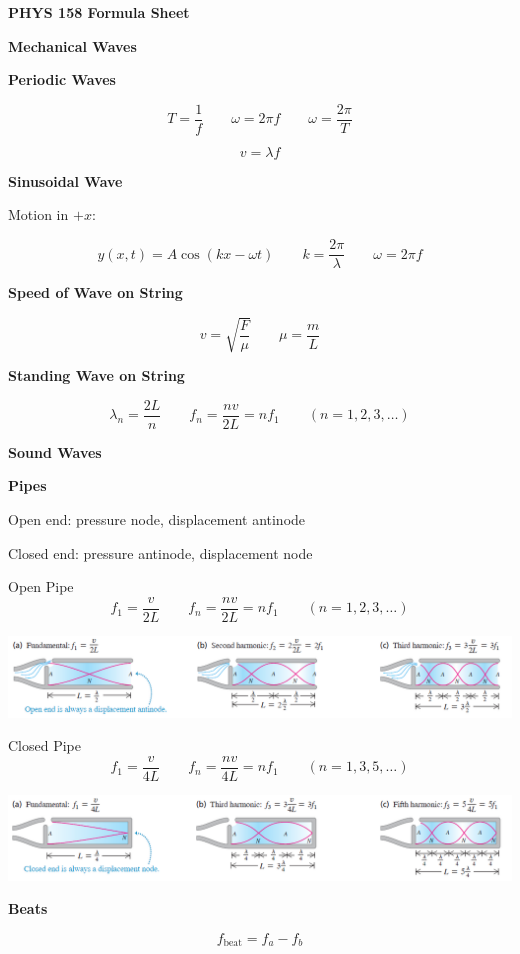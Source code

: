 \documentclass[10pt]{article}
\newcommand\sectionheading[1]{\begin{center}\large{\textbf{#1}}\end{center}\normalsize}
\newcommand\heading[1]{\medskip\textbf{#1}\medskip}
\begin{document}
\begin{center}
    \huge{\textbf{PHYS 158 Formula Sheet}}
\end{center}

\begin{multicols*}{3}

\sectionheading{Mechanical Waves}

\heading{Periodic Waves}

\[T=\frac1f \qquad \omega = 2\pi f \qquad \omega = \frac{2\pi}{T}\]

\[v=\lambda f\]

\heading{Sinusoidal Wave}

Motion in $+x$:

\[y(x,t)=A\cos(kx-\omega t) \qquad k=\frac{2\pi}{\lambda} \qquad \omega=2\pi f\]

\heading{Speed of Wave on String}

\[v=\sqrt{\frac{F}{\mu}} \qquad \mu=\frac{m}{L}\]

\heading{Standing Wave on String}

\[\lambda_n=\frac{2L}{n} \qquad f_n=\frac{nv}{2L}=nf_1 \qquad (n=1,2,3,\ldots)\]

\sectionheading{Sound Waves}

\heading{Pipes}

Open end: pressure node, displacement antinode

Closed end: pressure antinode, displacement node

Open Pipe
\[f_1=\frac{v}{2L} \qquad f_n=\frac{nv}{2L}=nf_1 \qquad (n=1,2,3,\ldots)\]

\includegraphics[scale=0.3]{images/fs_open_pipe.png}

Closed Pipe 
\[f_1=\frac{v}{4L} \qquad f_n=\frac{nv}{4L}=nf_1 \qquad (n=1,3,5,\ldots)\]

\includegraphics[scale=0.3]{images/fs_closed_pipe.png}

\heading{Beats}

\[f_{\text{beat}}=f_a-f_b\]


\end{multicols*}
\end{document}
